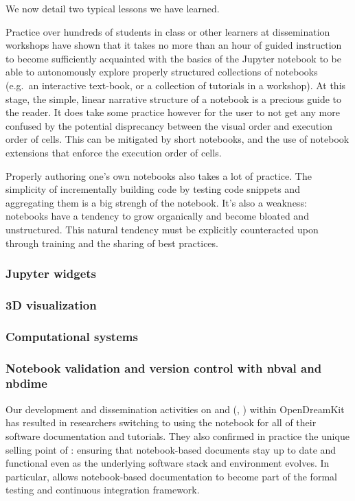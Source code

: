 \documentclass{deliverablereport}
\begin{document}
We now detail two typical lessons we have learned.

Practice over hundreds of students in class or other learners at
dissemination workshops have shown that it takes no more than an hour of
guided instruction to become sufficiently acquainted with the basics of
the Jupyter notebook to be able to autonomously explore properly
structured collections of notebooks (e.g.~an interactive text-book, or a
collection of tutorials in a workshop). At this stage, the simple,
linear narrative structure of a notebook is a precious guide to the
reader.
It does take some practice however for the user to not get any more
confused by the potential disprecancy between the visual order and
execution order of cells. This can be mitigated by short notebooks, and
the use of notebook extensions that enforce the execution order of
cells.

Properly authoring one's own notebooks also takes a lot of practice.
The simplicity of incrementally building code by testing code snippets
and aggregating them is a big strengh of the notebook. It's also a
weakness: notebooks have a tendency to grow organically and become
bloated and unstructured. This natural tendency must be explicitly
counteracted upon through training and the sharing of best practices.

\subsubsection{Jupyter widgets}

\subsubsection{3D visualization}

\subsubsection{Computational systems}

\subsubsection{Notebook validation and version control with nbval and nbdime}

Our development and dissemination activities on \nbval and \nbdime
(, ) within
OpenDreamKit has resulted in researchers switching to using the
notebook for all of their software documentation and tutorials. They
also confirmed in practice the unique selling point of \nbval:
ensuring that notebook-based documents stay up to date and functional
even as the underlying software stack and environment evolves. In
particular, \nbval allows notebook-based documentation to become part
of the formal testing and continuous integration framework.
\end{document}
